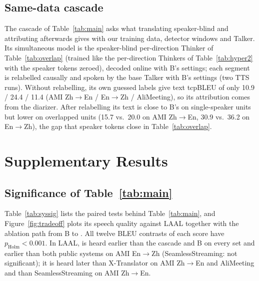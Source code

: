 \subsection{Same-data cascade}
\label{app:cascade}
The cascade of Table~\ref{tab:main} asks what translating speaker-blind and attributing afterwards gives with our
training data, detector windows and Talker. Its simultaneous model is the speaker-blind per-direction Thinker of
Table~\ref{tab:overlap} (trained like the per-direction Thinkers of Table~\ref{tab:hyper2} with the speaker tokens
zeroed), decoded online with B's settings; each segment is relabelled causally and spoken by the base Talker with B's
settings (two TTS runs). Without relabelling, its own guessed labels give text tcpBLEU of only 10.9 / 24.4 / 11.4 (AMI
Zh$\rightarrow$En / En$\rightarrow$Zh / AliMeeting), so its attribution comes from the diarizer. After relabelling its
text is close to B's on single-speaker units but lower on overlapped units (15.7 vs.\ 20.0 on AMI Zh$\rightarrow$En,
30.9 vs.\ 36.2 on En$\rightarrow$Zh), the gap that speaker tokens close in Table~\ref{tab:overlap}.
\fi

\section{Supplementary Results}
\label{app:more}
\label{app:sig10}
\label{app:postreview}

\subsection{Significance of Table~\ref{tab:main}}
Table~\ref{tab:syssig} lists the paired tests behind Table~\ref{tab:main}, and Figure~\ref{fig:tradeoff} plots its
speech quality against LAAL together with the ablation path from B to \sys{}. All twelve BLEU contrasts of each score have
$p_\text{Holm}<0.001$. In LAAL, \sys{} is heard earlier than the cascade and B on every set and earlier than both public systems on
AMI En$\rightarrow$Zh (SeamlessStreaming: not significant); it is heard later than X-Translator on AMI
Zh$\rightarrow$En and AliMeeting and than SeamlessStreaming on AMI Zh$\rightarrow$En.



